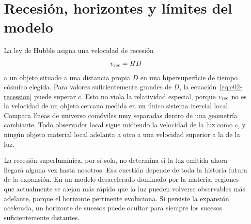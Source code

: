 \begin{classroomqa}
\end{classroomqa}

\section{Recesión, horizontes y límites del modelo}

La ley de Hubble asigna una velocidad de recesión
\begin{equation}
v_{\rm rec}=HD
\label{eq:c02-recession}
\end{equation}
a un objeto situado a una distancia propia \(D\) en una hipersuperficie de tiempo cósmico elegida. Para valores suficientemente grandes de \(D\), la ecuación~\eqref{eq:c02-recession} puede superar \(c\). Esto no viola la relatividad especial, porque \(v_{\rm rec}\) no es la velocidad de un objeto cercano medida en un único sistema inercial local. Compara líneas de universo comóviles muy separadas dentro de una geometría cambiante. Todo observador local sigue midiendo la velocidad de la luz como \(c\), y ningún objeto material local adelanta a otro a una velocidad superior a la de la luz.

\begin{classroomqa}
\end{classroomqa}

La recesión superlumínica, por sí sola, no determina si la luz emitida ahora llegará alguna vez hasta nosotros. Esa cuestión depende de toda la historia futura de la expansión. En un modelo desacelerado dominado por la materia, regiones que actualmente se alejan más rápido que la luz pueden volverse observables más adelante, porque el horizonte pertinente evoluciona. Si persiste la expansión acelerada, un horizonte de sucesos puede ocultar para siempre los sucesos suficientemente distantes.

